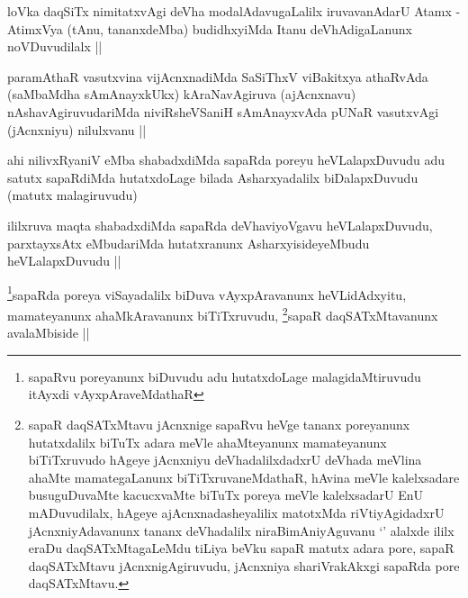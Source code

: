 
\begin{artha}
loVka daqSiTx nimitatxvAgi deVha modalAdavugaLalilx iruvavanAdarU
Atamx - AtimxVya (tAnu, tananxdeMba) budidhxyiMda Itanu
deVhAdigaLanunx noVDuvudilalx ||
\end{artha}


\begin{artha}
paramAthaR vasutxvina vijAcnxnadiMda SaSiThxV viBakitxya athaRvAda
(saMbaMdha sAmAnayxkUkx) kAraNavAgiruva (ajAcnxnavu)
nAshavAgiruvudariMda niviRsheVSaniH sAmAnayxvAda pUNaR vasutxvAgi
(jAcnxniyu) nilulxvanu ||
\end{artha}


\stext


\begin{artha}
ahi nilivxRyaniV eMba shabadxdiMda sapaRda poreyu heVLalapxDuvudu adu
satutx sapaRdiMda hutatxdoLage bilada Asharxyadalilx biDalapxDuvudu
(matutx malagiruvudu) 
\end{artha}

\begin{artha}
ililxruva maqta shabadxdiMda sapaRda deVhaviyoVgavu heVLalapxDuvudu,
parxtayxsAtx eMbudariMda hutatxranunx AsharxyisideyeMbudu
heVLalapxDuvudu ||
\end{artha}

\begin{artha}
\footnote{sapaRvu poreyanunx biDuvudu adu hutatxdoLage
  malagidaMtiruvudu itAyxdi vAyxpAraveMdathaR}sapaRda poreya viSayadalilx biDuva vAyxpAravanunx
heVLidAdxyitu, mamateyanunx ahaMkAravanunx
biTiTxruvudu, \footnote{sapaR daqSATxMtavu jAcnxnige sapaRvu heVge
  tananx poreyanunx hutatxdalilx biTuTx adara meVle ahaMteyanunx
  mamateyanunx biTiTxruvudo hAgeye jAcnxniyu deVhadalilxdadxrU deVhada
  meVlina ahaMte mamategaLanunx biTiTxruvaneMdathaR, hAvina meVle
  kalelxsadare busuguDuvaMte kacucxvaMte biTuTx poreya meVle
  kalelxsadarU EnU mADuvudilalx, hAgeye ajAcnxnadasheyalilix matotxMda
  riVtiyAgidadxrU jAcnxniyAdavanunx tananx deVhadalilx
  niraBimAniyAguvanu `\stext' alalxde ililx eraDu daqSATxMtagaLeMdu
  tiLiya beVku sapaR matutx adara pore, sapaR daqSATxMtavu
  jAcnxnigAgiruvudu,  jAcnxniya shariVrakAkxgi sapaRda pore daqSATxMtavu.}sapaR daqSATxMtavanunx avalaMbiside ||
\end{artha}

